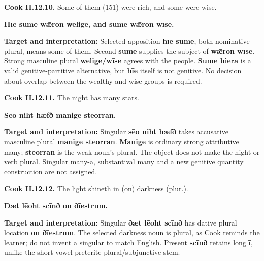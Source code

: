 \par\begin{minipage}{\linewidth}\raggedright
\textbf{Cook II.12.10.} Some of them (151) were rich, and some were wise.

\textbf{Hīe sume wǣron welige, and sume wǣron wīse.}

\textbf{Target and interpretation:} Selected apposition \textbf{hīe sume}, both nominative plural, means some of them. Second \textbf{sume} supplies the subject of \textbf{wǣron wīse}. Strong masculine plural \textbf{welige/\allowbreak{}wīse} agrees with the people. \textbf{Sume hiera} is a valid genitive-partitive alternative, but \textbf{hīe} itself is not genitive. No decision about overlap between the wealthy and wise groups is required.

\end{minipage}\par\addvspace{4pt}

\par\begin{minipage}{\linewidth}\raggedright
\textbf{Cook II.12.11.} The night has many stars.

\textbf{Sēo niht hæfð manige steorran.}

\textbf{Target and interpretation:} Singular \textbf{sēo niht hæfð} takes accusative masculine plural \textbf{manige steorran}. \textbf{Manige} is ordinary strong attributive many; \textbf{steorran} is the weak noun's plural. The object does not make the night or verb plural. Singular many-a, substantival many and a new genitive quantity construction are not assigned.

\end{minipage}\par\addvspace{4pt}

\par\begin{minipage}{\linewidth}\raggedright
\textbf{Cook II.12.12.} The light shineth in (on) darkness (plur.).

\textbf{Ðæt lēoht scīnð on ðīestrum.}

\textbf{Target and interpretation:} Singular \textbf{ðæt lēoht scīnð} has dative plural location \textbf{on ðīestrum}. The selected darkness noun is plural, as Cook reminds the learner; do not invent a singular to match English. Present \textbf{scīnð} retains long \textbf{ī}, unlike the short-vowel preterite plural/\allowbreak{}subjunctive stem.

\end{minipage}\par\addvspace{4pt}


